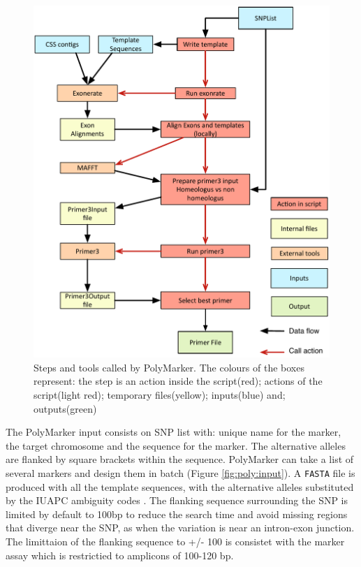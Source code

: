 \begin{figure}
\includegraphics[width=1\textwidth]{PolyMarker/Figures/pipeline.pdf}
\caption[Steps and tools called by PolyMarker]{Steps and tools called by PolyMarker. The colours of the boxes represent: the step is an action inside the script(red); actions of the script(light red); temporary files(yellow); inputs(blue) and; outputs(green)}
\label{fig:poly:pipeline}
\end{figure}

The PolyMarker input consists on SNP list with: unique name for the marker, the target chromosome and the sequence for the marker. 
The alternative alleles are flanked by square brackets within the sequence. PolyMarker can take a list of several markers and design them in batch (Figure \ref{fig:poly:input}). 
A \verb|FASTA| file is produced with all the template sequences, with the alternative alleles substituted by the IUAPC ambiguity codes \citep{Cornish-Bowden1985}. 
The flanking sequence surrounding the SNP is limited by default to 100bp to reduce the search time and avoid missing regions that diverge near the SNP, as when the variation is near an intron-exon junction. 
The limittaion of the flanking sequence to +/- 100 is consistet with the marker assay which is restrictied to amplicons of 100-120 bp. 

